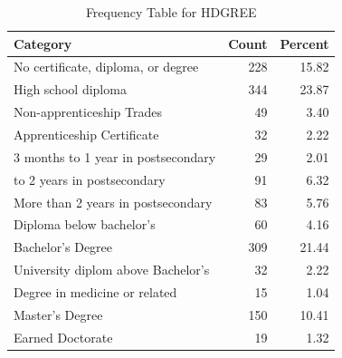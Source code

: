 \begin{table}[!h]
\centering
\caption{\label{tab:tab:HDGREE}Frequency Table for HDGREE}
\centering
\begin{tabular}[t]{lrr}
\toprule
Category & Count & Percent\\
\midrule
No certificate, diploma, or degree & 228 & 15.82\\
High school diploma & 344 & 23.87\\
Non-apprenticeship Trades & 49 & 3.40\\
Apprenticeship Certificate & 32 & 2.22\\
3 months to 1 year in postsecondary & 29 & 2.01\\
\addlinespace
1 to 2 years in postsecondary & 91 & 6.32\\
More than 2 years in postsecondary & 83 & 5.76\\
Diploma below bachelor's & 60 & 4.16\\
Bachelor's Degree & 309 & 21.44\\
University diplom above Bachelor's & 32 & 2.22\\
\addlinespace
Degree in medicine or related & 15 & 1.04\\
Master's Degree & 150 & 10.41\\
Earned Doctorate & 19 & 1.32\\
\bottomrule
\end{tabular}
\end{table}
